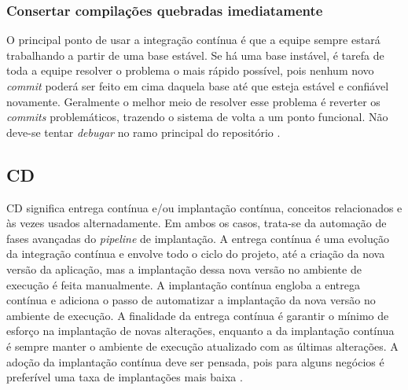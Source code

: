 \subsubsection{Consertar compilações quebradas imediatamente}
O principal ponto de usar a integração contínua é que a equipe sempre estará trabalhando a partir de uma base estável. Se há uma base instável, é tarefa de toda a equipe resolver o problema o mais rápido possível, pois nenhum novo \emph{commit} poderá ser feito em cima daquela base até que esteja estável e confiável novamente. Geralmente o melhor meio de resolver esse problema é reverter os \emph{commits} problemáticos, trazendo o sistema de volta a um ponto funcional. Não deve-se tentar \emph{debugar} no ramo principal do repositório \cite{martin-fowler-continuous-integration}.



\subsection{CD}
CD significa entrega contínua e/ou implantação contínua, conceitos relacionados e às vezes usados alternadamente. Em ambos os casos, trata-se da automação de fases avançadas do \emph{pipeline} de implantação. A entrega contínua é uma evolução da integração contínua e envolve todo o ciclo do projeto, até a criação da nova versão da aplicação, mas a implantação dessa nova versão no ambiente de execução é feita manualmente. A implantação contínua engloba a entrega contínua e adiciona o passo de automatizar a implantação da nova versão no ambiente de execução. A finalidade da entrega contínua é garantir o mínimo de esforço na implantação de novas alterações, enquanto a da implantação contínua é sempre manter o ambiente de execução atualizado com as últimas alterações. A adoção da implantação contínua deve ser pensada, pois para alguns negócios é preferível uma taxa de implantações mais baixa \cite{gitlab-ci-cd,redhat-ci-cd}.

